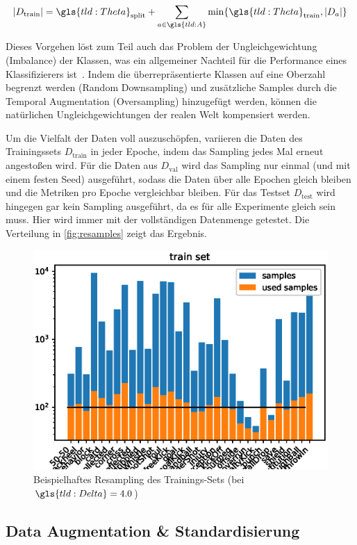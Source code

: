 \begin{equation}
    \label{eq:limit}
    | D_\text{train} | = \gls{tld:Theta}_\text{split} + \sum\limits_{a \in \gls{tld:A}} \min \{ \gls{tld:Theta}_\text{train}, |D_a| \}
\end{equation}

Dieses Vorgehen löst zum Teil auch das Problem der Ungleichgewichtung (Imbalance) der Klassen, was ein allgemeiner Nachteil für die Performance eines Klassifizierers ist~\cite{Giancola18, Burkov19}.
Indem die überrepräsentierte Klassen auf eine Oberzahl begrenzt werden (Random Downsampling) und zusätzliche Samples durch die Temporal Augmentation (Oversampling) hinzugefügt werden, können die natürlichen Ungleichgewichtungen der realen Welt kompensiert werden.

Um die Vielfalt der Daten voll auszuschöpfen, variieren die Daten des Trainingssets $D_{\text{train}}$ in jeder Epoche, indem das Sampling jedes Mal erneut angestoßen wird.
Für die Daten aus $D_\text{val}$ wird das Sampling nur einmal (und mit einem festen Seed) ausgeführt, sodass die Daten über alle Epochen gleich bleiben und die Metriken pro Epoche vergleichbar bleiben.
Für das Testset $D_\text{test}$ wird hingegen gar kein Sampling ausgeführt, da es für alle Experimente gleich sein muss.
Hier wird immer mit der vollständigen Datenmenge getestet.
Die Verteilung in \autoref{fig:resamples} zeigt das Ergebnis.

\begin{figure}
    \centering
    \includegraphics[width=.6\linewidth]{img/data-plots/4sec/class_distribution_used_samples_train_202010-1419-3803.eps}
    \caption{Beispielhaftes Resampling des Trainings-Sets (bei $\gls{tld:Delta} = 4.0$)}
    \label{fig:resamples}
\end{figure}

\subsection{Data Augmentation \& Standardisierung}
\label{subsec:data-augmentation}

